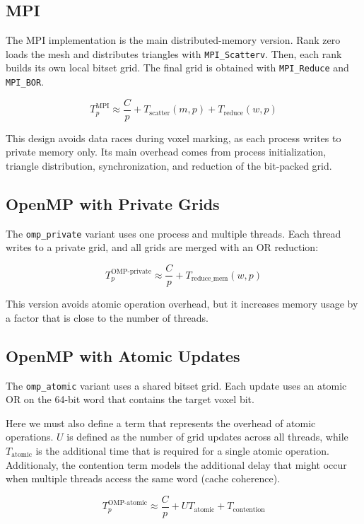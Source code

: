 \documentclass[conference]{IEEEtran}
\begin{document}
\subsection{MPI}

The MPI implementation is the main distributed-memory version. Rank zero loads
the mesh and distributes triangles with \texttt{MPI\_Scatterv}. Then, each rank
builds its own local bitset grid. The final grid is obtained with
\texttt{MPI\_Reduce} and \texttt{MPI\_BOR}.

\[
  T_p^{\text{MPI}} \approx \frac{C}{p} + T_{\text{scatter}}(m,p) + T_{\text{reduce}}(w,p)
\]

This design avoids data races during voxel marking, as each process writes to
private memory only. Its main overhead comes from process initialization,
triangle distribution, synchronization, and reduction of the bit-packed grid.

\subsection{OpenMP with Private Grids}

The \texttt{omp\_private} variant uses one process and multiple threads. Each
thread writes to a private grid, and all grids are merged with an OR reduction:

\[
  T_p^{\text{OMP-private}} \approx \frac{C}{p} + T_{\text{reduce\_mem}}(w,p)
\]

This version avoids atomic operation overhead, but it increases memory usage by
a factor that is close to the number of threads.

\subsection{OpenMP with Atomic Updates}

The \texttt{omp\_atomic} variant uses a shared bitset grid. Each update uses an
atomic OR on the 64-bit word that contains the target voxel bit.

Here we must also define a term that represents the overhead of atomic
operations. $U$ is defined as the number of grid updates across all threads,
while $T_{\text{atomic}}$ is the additional time that is required for a single
atomic operation. Additionaly, the contention term models the additional delay
that might occur when multiple threads access the same word (cache coherence).

\[
  T_p^{\text{OMP-atomic}} \approx \frac{C}{p} + U T_{\text{atomic}} + T_{\text{contention}}
\]
\end{document}
